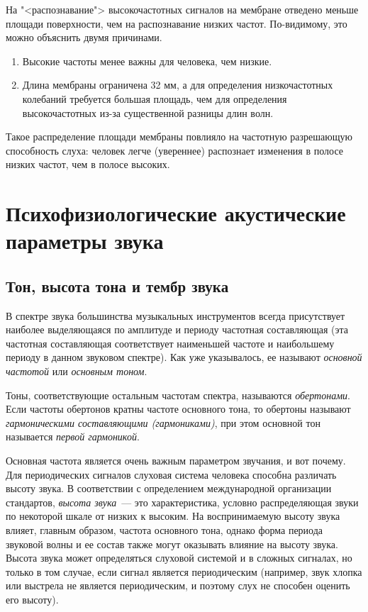\documentclass[oneside, final, 14pt]{extreport}
\begin{document}
На "<распознавание"> высокочастотных сигналов на мембране отведено меньше площади поверхности,
чем на распознавание низких частот. По-видимому, это можно объяснить двумя причинами. 
\begin{enumerate}
\item Высокие частоты менее важны для человека, чем низкие.
\item Длина мембраны ограничена 32 мм, а для определения низкочастотных колебаний требуется большая площадь, чем для определения высокочастотных из-за существенной разницы длин волн. \end{enumerate}
Такое распределение площади мембраны повлияло на частотную разрешающую способность слуха: человек легче (увереннее) распознает изменения в полосе низких частот, чем в полосе высоких.

\section{Психофизиологические акустические параметры звука}
\subsection{Тон, высота тона и тембр звука}
В спектре звука большинства музыкальных инструментов всегда присутствует наиболее выделяющаяся по амплитуде и периоду частотная составляющая (эта частотная составляющая соответствует наименьшей частоте и наибольшему периоду в данном звуковом спектре). Как уже указывалось, ее называют {\itshape основной частотой} или {\itshape основным тоном}. 

Тоны, соответствующие остальным частотам спектра, называются {\itshape обертонами}. Если частоты обертонов кратны частоте основного тона, то обертоны называют {\itshape гармоническими составляющими (гармониками)}, при этом основной тон называется {\itshape первой гармоникой}.

Основная частота является очень важным параметром звучания, и вот почему. Для периодических сигналов слуховая система человека способна различать высоту звука. В соответствии с определением международной организации стандартов, {\itshape высота звука}~--- это характеристика, условно распределяющая звуки по некоторой шкале от низких к высоким. На воспринимаемую высоту звука влияет, главным образом, частота основного тона, однако форма периода звуковой волны и ее состав также могут оказывать влияние на высоту звука. Высота звука может определяться слуховой системой и в сложных сигналах, но только в том случае, если сигнал является периодическим (например, звук хлопка или выстрела не является периодическим, и поэтому слух не способен оценить его высоту).
\end{document}
